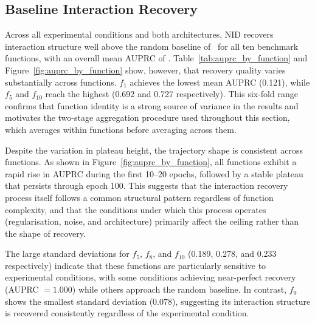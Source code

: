 \documentclass{article}
\begin{document}
\subsection{Baseline Interaction Recovery}

Across all experimental conditions and both architectures, NID recovers
interaction structure well above the random baseline of \statRandomBaseline\
for all ten benchmark functions, with an overall mean AUPRC of
\statOverallMeanAUPRC. Table~\ref{tab:auprc_by_function} and
Figure~\ref{fig:auprc_by_function} show, however, that recovery quality
varies substantially across functions. $f_1$ achieves the lowest mean AUPRC
(0.121), while $f_5$ and $f_{10}$ reach the highest (0.692 and 0.727
respectively). This six-fold range confirms that function identity is a
strong source of variance in the results and motivates the two-stage
aggregation procedure used throughout this section, which averages within
functions before averaging across them.

Despite the variation in plateau height, the trajectory shape is
consistent across functions. As shown in Figure~\ref{fig:auprc_by_function},
all functions exhibit a rapid rise in AUPRC during the first 10--20 epochs,
followed by a stable plateau that persists through epoch 100. This suggests
that the interaction recovery process itself follows a common structural
pattern regardless of function complexity, and that the conditions under which
this process operates (regularisation, noise, and architecture) primarily
affect the ceiling rather than the shape of recovery.

The large standard deviations for $f_5$, $f_8$, and $f_{10}$ (0.189, 0.278,
and 0.233 respectively) indicate that these functions are particularly
sensitive to experimental conditions, with some conditions achieving near-perfect
recovery (AUPRC $= 1.000$) while others approach the random baseline. In
contrast, $f_9$ shows the smallest standard deviation (0.078), suggesting its
interaction structure is recovered consistently regardless of the experimental
condition.
\end{document}
